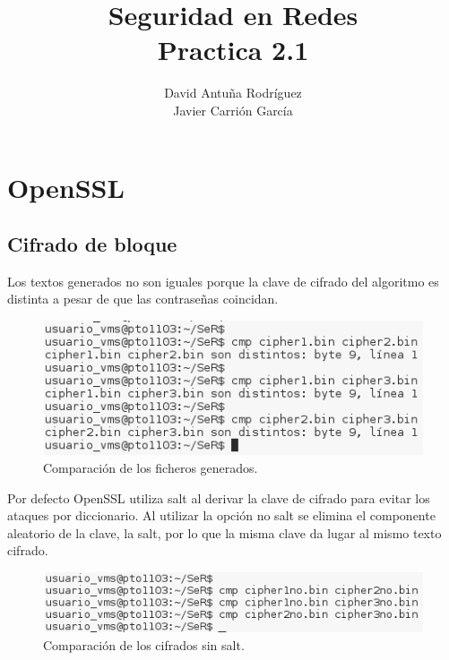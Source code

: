 \documentclass[11pt]{article}
\title{\Large Seguridad en Redes\\Practica 2.1}
\author{David Antuña Rodríguez\\Javier Carrión García}
\date{}
\begin{document}
  \raggedright

  \maketitle
  \newpage

  \section{OpenSSL}
    \subsection{Cifrado de bloque}
      \par
      Los textos generados no son iguales porque la clave de cifrado del algoritmo es distinta a pesar de que las contraseñas coincidan.
      \begin{figure}[!h]
        \centering
        \includegraphics[width = .6\textwidth]{cmp_ciphers}
        \caption{Comparación de los ficheros generados.}
      \end{figure}

      \bigskip
      \par
      Por defecto OpenSSL utiliza salt al derivar la clave de cifrado para evitar los ataques por diccionario. Al utilizar la
      opción no salt se elimina el componente aleatorio de la clave, la salt, por lo que la misma clave da lugar al mismo texto cifrado.
      \begin{figure}[!h]
        \centering
        \includegraphics[width = .7\textwidth]{cmp_ciphers_nosalt}
        \caption{Comparación de los cifrados sin salt.}
      \end{figure}
\end{document}
